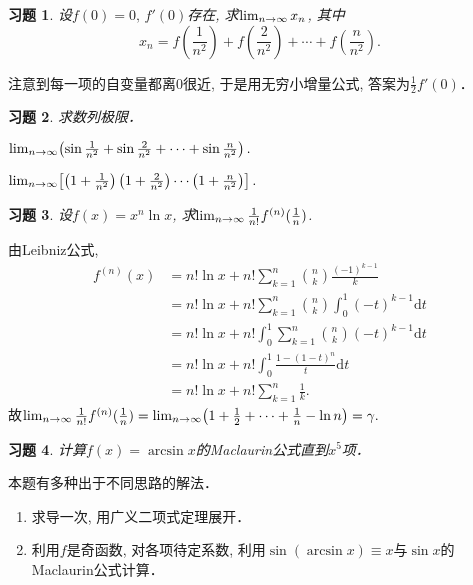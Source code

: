 \documentclass[11pt,a4paper]{ctexart}
\makeatletter
\theoremstyle{thmseries} %
\theoremstyle{exerseries}
\newtheorem{exer}{习题}[section]
\renewenvironment{proof}[1][\proofname]{\par
  \pushQED{\qed}%
  \normalfont \topsep6\p@\@plus6\p@\relax
  \trivlist
  \item[\hskip\labelsep
        \itshape
    #1\@addpunct{}]\ignorespaces
}{%
  \popQED\endtrivlist\@endpefalse
}
\newenvironment{sol}{\begin{proof}[\bfseries\upshape 解\quad]}{\end{proof}}
\newcommand{\bra}[1]{\mathopen{}\left(#1\right)}
\newcommand{\sbra}[1]{\mathopen{}\left[#1\right]}
\renewcommand{\d}{\mathrm{d}}
\def \nti {\mathnormal{n}\to\infty}
\makeatother
\begin{document}
\begin{exer}
	设$f(0)=0,\,f'(0)$存在, 求$\lim_{\nti}x_n$, 其中
	\[x_n=f\bra{\frac{1}{n^2}}+f\bra{\frac{2}{n^2}}+\cdots+f\bra{\frac{n}{n^2}}.\]
\end{exer}
\begin{sol}
	注意到每一项的自变量都离$0$很近, 于是用无穷小增量公式, 答案为$\frac{1}{2}f'(0)$．
\end{sol}

\begin{exer}
	求数列极限．
	\begin{enumerate}
	\end{enumerate}
\end{exer}

\begin{exer}
	设$f(x)=x^n\ln x$, 求$\lim_{\nti}\frac{1}{n!}f^{(n)}(\frac{1}{n})$.
\end{exer}
\begin{sol}
	由Leibniz公式, 
	\begin{align*}
		f^{(n)}(x)&=n!\ln x+n!\sum_{k=1}^{n}\binom{n}{k}\frac{(-1)^{k-1}}{k}\\
		&=n!\ln x+n!\sum_{k=1}^{n}\binom{n}{k}\int_{0}^{1}(-t)^{k-1}\d t\\
		&=n!\ln x+n!\int_{0}^{1}\sum_{k=1}^{n}\binom{n}{k}(-t)^{k-1}\d t\\
		&=n!\ln x+n!\int_{0}^{1}\frac{1-(1-t)^n}{t}\d t\\
		&=n!\ln x+n!\sum_{k=1}^{n}\frac{1}{k}.
	\end{align*}
	故$\lim_{\nti}\frac{1}{n!}f^{(n)}(\frac{1}{n})=\lim_{\nti}\bra{1+\frac{1}{2}+\cdots+\frac{1}{n}-\ln n}=\gamma.$
\end{sol}

\begin{exer}
	计算$f(x)=\arcsin x$的Maclaurin公式直到$x^5$项．
\end{exer}
\begin{sol}
	本题有多种出于不同思路的解法．
	\begin{enumerate}
		\item 求导一次, 用广义二项式定理展开．
		\item 利用$f$是奇函数, 对各项待定系数, 利用$\sin(\arcsin x)\equiv x$与$\sin x$的Maclaurin公式计算．\qedhere
	\end{enumerate}
\end{sol}
\end{document}
